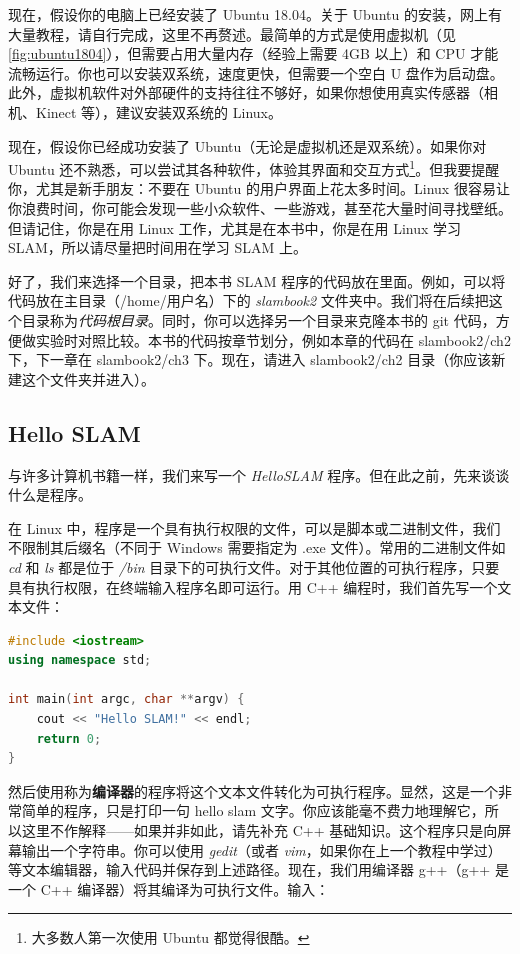 现在，假设你的电脑上已经安装了 Ubuntu 18.04。关于 Ubuntu 的安装，网上有大量教程，请自行完成，这里不再赘述。最简单的方式是使用虚拟机（见 \autoref{fig:ubuntu1804}），但需要占用大量内存（经验上需要 4GB 以上）和 CPU 才能流畅运行。你也可以安装双系统，速度更快，但需要一个空白 U 盘作为启动盘。此外，虚拟机软件对外部硬件的支持往往不够好，如果你想使用真实传感器（相机、Kinect 等），建议安装双系统的 Linux。

现在，假设你已经成功安装了 Ubuntu（无论是虚拟机还是双系统）。如果你对 Ubuntu 还不熟悉，可以尝试其各种软件，体验其界面和交互方式\footnote{大多数人第一次使用 Ubuntu 都觉得很酷。}。但我要提醒你，尤其是新手朋友：不要在 Ubuntu 的用户界面上花太多时间。Linux 很容易让你浪费时间，你可能会发现一些小众软件、一些游戏，甚至花大量时间寻找壁纸。但请记住，你是在用 Linux 工作，尤其是在本书中，你是在用 Linux 学习 SLAM，所以请尽量把时间用在学习 SLAM 上。

好了，我们来选择一个目录，把本书 SLAM 程序的代码放在里面。例如，可以将代码放在主目录（/home/用户名）下的 \textit{slambook2} 文件夹中。我们将在后续把这个目录称为\textit{代码根目录}。同时，你可以选择另一个目录来克隆本书的 git 代码，方便做实验时对照比较。本书的代码按章节划分，例如本章的代码在 slambook2/ch2 下，下一章在 slambook2/ch3 下。现在，请进入 slambook2/ch2 目录（你应该新建这个文件夹并进入）。

\subsection{Hello SLAM}
与许多计算机书籍一样，我们来写一个 \textit{HelloSLAM} 程序。但在此之前，先来谈谈什么是程序。

在 Linux 中，程序是一个具有执行权限的文件，可以是脚本或二进制文件，我们不限制其后缀名（不同于 Windows 需要指定为 .exe 文件）。常用的二进制文件如 \textit{cd} 和 \textit{ls} 都是位于 \textit{/bin} 目录下的可执行文件。对于其他位置的可执行程序，只要具有执行权限，在终端输入程序名即可运行。用 C++ 编程时，我们首先写一个文本文件：

\begin{lstlisting}[language=C++,caption=slambook2/ch2/helloSLAM.cpp]
#include <iostream>
using namespace std;

int main(int argc, char **argv) {
    cout << "Hello SLAM!" << endl;
    return 0;
}
\end{lstlisting}

然后使用称为\textbf{编译器}的程序将这个文本文件转化为可执行程序。显然，这是一个非常简单的程序，只是打印一句 hello slam 文字。你应该能毫不费力地理解它，所以这里不作解释——如果并非如此，请先补充 C++ 基础知识。这个程序只是向屏幕输出一个字符串。你可以使用 \textit{gedit}（或者 \textit{vim}，如果你在上一个教程中学过）等文本编辑器，输入代码并保存到上述路径。现在，我们用编译器 g++（g++ 是一个 C++ 编译器）将其编译为可执行文件。输入：

